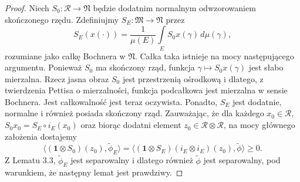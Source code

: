\begin{proof}
Niech $S_{0}: \mathcal{R} \rightarrow \mathfrak{N}$ będzie dodatnim normalnym
odwzorowaniem skończonego rzędu.
Zdefiniujmy
$S_{E}: \mathfrak{M} \rightarrow \mathfrak{N}$ przez
\begin{equation}
S_{E}(x(\cdot)) = \frac{1}{\mu(E)}
\int \limits_{E} S_{0}x(\gamma) \, d\mu(\gamma),
\end{equation}
rozumiane jako całkę Bochnera w $\mathfrak{N}$.
Całka taka istnieje na mocy następującego argumentu.
Ponieważ $S_{0}$ ma skończony rząd, funkcja
$\gamma \mapsto S_{0}x(\gamma)$ jest słabo mierzalna.
Rzecz jasna obraz $S_{0}$ jest przestrzenią ośrodkową i dlatego,
z twierdzenia Pettisa o mierzalności,
funkcja podcałkowa jest mierzalna w sensie Bochnera.
Jest całkowalność jest teraz oczywista.
Ponadto, $S_{E}$ jest dodatnie, normalne i również posiada skończony rząd.
Zauważając, że dla każdego $x_{0} \in \mathcal{R}$,
$S_{0}x_{0} = S_{E} \circ i_{E} (x_{0})$ oraz
biorąc dodatni element $z_{0} \in \mathcal{R} \otimes \mathcal{R}$,
na mocy głównego założenia dostajemy
\begin{equation}
\langle (\mathbf{1} \otimes S_{0})(z_{0}) , \tilde{\phi}_{E} \rangle =
\langle (\mathbf{1} \otimes S_{E})(i_{E} \otimes i_{E})(z_{0}),
\tilde{\phi} \rangle \geq 0.
\end{equation}
Z Lematu 3.3, $\tilde{\phi}_{E}$ jest separowalny i dlatego również
$\tilde{\phi}$ jest separowalny,
pod warunkiem, że następny lemat jest prawdziwy.
\end{proof}

